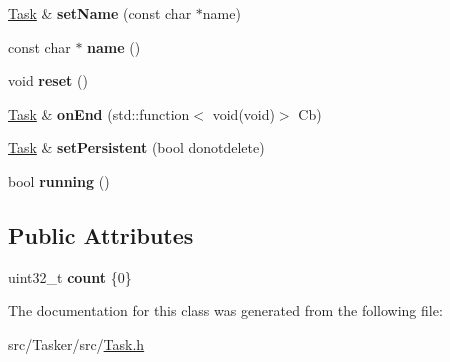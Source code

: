 \begin{DoxyCompactItemize}
\mbox{\label{class_task_ab3d1be80ad209a597a729166a80efc92}} 
\hyperlink{class_task}{Task} \& {\bfseries set\+Name} (const char $\ast$name)
\item 
\mbox{\label{class_task_aba0bd15f206791e57958128c5be34956}} 
const char $\ast$ {\bfseries name} ()
\item 
\mbox{\label{class_task_aa3a2b2bf899730aa64e1cf3c1d868b47}} 
void {\bfseries reset} ()
\item 
\mbox{\label{class_task_a4804088579cabf62cd81f2f85d79f5c4}} 
\hyperlink{class_task}{Task} \& {\bfseries on\+End} (std\+::function$<$ void(void)$>$ Cb)
\item 
\mbox{\label{class_task_a60541f7f451ab3ce1831530272e1d428}} 
\hyperlink{class_task}{Task} \& {\bfseries set\+Persistent} (bool donotdelete)
\item 
\mbox{\label{class_task_a0922035b69fa2db9fcfc8624e0857724}} 
bool {\bfseries running} ()
\end{DoxyCompactItemize}
\subsection*{Public Attributes}
\begin{DoxyCompactItemize}
\item 
\mbox{\label{class_task_a658d28d140840da2ae4ea5a92923a326}} 
uint32\+\_\+t {\bfseries count} \{0\}
\end{DoxyCompactItemize}


The documentation for this class was generated from the following file\+:\begin{DoxyCompactItemize}
\item 
src/\+Tasker/src/\hyperlink{_task_8h}{Task.\+h}\end{DoxyCompactItemize}
